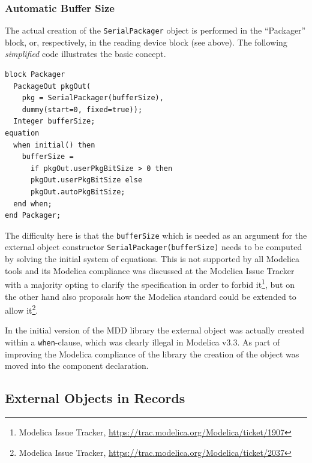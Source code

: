 \documentclass{resources/modelica}
\newcommand{\modelica}[1]{\lstinline[language=modelica]|#1|}
\begin{document}
\subsubsection{Automatic Buffer Size}

The actual creation of the \modelica{SerialPackager} object is performed in
the ``Packager'' block, or, respectively, in the reading device block (see
above). The following \emph{simplified} code illustrates the basic concept.
\begin{lstlisting}[language=modelica]
block Packager
  PackageOut pkgOut(
    pkg = SerialPackager(bufferSize),
    dummy(start=0, fixed=true));
  Integer bufferSize;
equation
  when initial() then
    bufferSize =
      if pkgOut.userPkgBitSize > 0 then
      pkgOut.userPkgBitSize else
      pkgOut.autoPkgBitSize;
  end when;
end Packager;
\end{lstlisting}
The difficulty here is that the \modelica{bufferSize} which is needed as an
argument for the external object constructor
\modelica{SerialPackager(bufferSize)} needs to be computed by solving the
initial system of equations. This is not supported by all Modelica tools and its
Modelica compliance was discussed at the Modelica Issue Tracker with a majority
opting to clarify the specification in order to forbid it\footnote{Modelica Issue Tracker,
\url{https://trac.modelica.org/Modelica/ticket/1907}}, but on the other hand
also proposals how the Modelica standard could be extended to allow
it\footnote{Modelica Issue Tracker,
\url{https://trac.modelica.org/Modelica/ticket/2037}}.

In the initial version of the MDD library the external object was actually
created within a \modelica{when}-clause,
which was clearly illegal in Modelica v3.3. As part of improving the Modelica
compliance of the library the creation of the object was moved into the
component declaration.

\subsection{External Objects in Records}
\label{sec:External Objects in Records}
\end{document}
